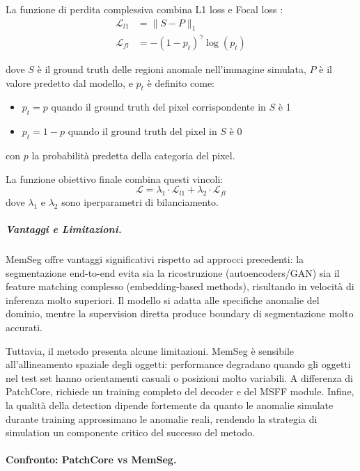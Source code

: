 La funzione di perdita complessiva combina L1 loss e Focal loss \cite{lin2017focal}:
\begin{align}
\mathcal{L}_{l1} &= \|S - P\|_1 \tag{8} \\
\mathcal{L}_{fl} &= -(1-p_t)^\gamma \log(p_t) \tag{9}
\end{align}

dove $S$ è il ground truth delle regioni anomale nell'immagine simulata, $P$ è il valore predetto dal modello, e $p_t$ è definito come:
\begin{itemize}
\item $p_t = p$ quando il ground truth del pixel corrispondente in $S$ è 1
\item $p_t = 1 - p$ quando il ground truth del pixel in $S$ è 0
\end{itemize}
con $p$ la probabilità predetta della categoria del pixel.

La funzione obiettivo finale combina questi vincoli:
\begin{equation}
\mathcal{L} = \lambda_1 \cdot \mathcal{L}_{l1} + \lambda_2 \cdot \mathcal{L}_{fl} \tag{10}
\end{equation}
dove $\lambda_1$ e $\lambda_2$ sono iperparametri di bilanciamento.



\subparagraph{Vantaggi e Limitazioni.}
MemSeg offre vantaggi significativi rispetto ad approcci precedenti: la segmentazione end-to-end evita sia la ricostruzione (autoencoders/GAN) sia il feature matching complesso (embedding-based methods), risultando in velocità di inferenza molto superiori. Il modello si adatta alle specifiche anomalie del dominio, mentre la supervision diretta produce boundary di segmentazione molto accurati.

Tuttavia, il metodo presenta alcune limitazioni. MemSeg è sensibile all'al\-li\-nea\-men\-to spaziale degli oggetti: performance degradano quando gli oggetti nel test set hanno orientamenti casuali o posizioni molto variabili. A differenza di PatchCore, richiede un training completo del decoder e del MSFF module. Infine, la qualità della detection dipende fortemente da quanto le anomalie simulate durante training approssimano le anomalie reali, rendendo la strategia di simulation un componente critico del successo del metodo.


\paragraph{Confronto: PatchCore vs MemSeg.}


